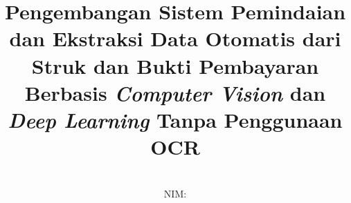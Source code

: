 \documentclass[bahasa, 12pt, a4paper, onecolumn, oneside, final]{report}
\begin{document}
\title{Pengembangan Sistem Pemindaian dan Ekstraksi Data Otomatis dari Struk dan Bukti Pembayaran Berbasis \emph{Computer Vision} dan \emph{Deep Learning} Tanpa Penggunaan OCR}
\date{}
\author{
	\MakeUppercase{\namapenulis \\
		NIM: \nimpenulis}
}

\setcounter{page}{1}





\pagestyle{plain}


% 



\titlespacing*{\chapter}{0pt}{0pt}{4pt}

\renewcommand{\contentsname}{DAFTAR ISI}
\renewcommand{\listfigurename}{DAFTAR GAMBAR}
\renewcommand{\listtablename}{DAFTAR TABEL}
\renewcommand{\bibname}{DAFTAR PUSTAKA}

\tableofcontents
\listofappendices
\listoffigures
\listoftables

\newpage


\end{document}
